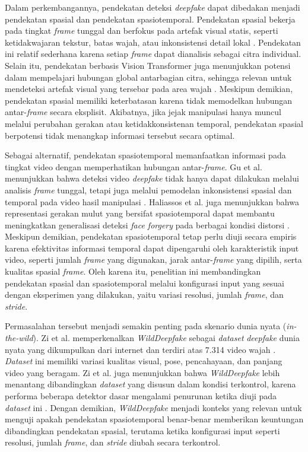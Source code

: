 Dalam perkembangannya, pendekatan deteksi \textit{deepfake} dapat dibedakan menjadi pendekatan spasial dan pendekatan spasiotemporal. Pendekatan spasial bekerja pada tingkat \textit{frame} tunggal dan berfokus pada artefak visual statis, seperti ketidakwajaran tekstur, batas wajah, atau inkonsistensi detail lokal \cite{Tolosana2020}\cite{Cao2022}. Pendekatan ini relatif sederhana karena setiap \textit{frame} dapat dianalisis sebagai citra individual. Selain itu, pendekatan berbasis Vision Transformer juga menunjukkan potensi dalam mempelajari hubungan global antarbagian citra, sehingga relevan untuk mendeteksi artefak visual yang tersebar pada area wajah \cite{dosovitskiy2021imageworth16x16words}\cite{app12062953}. Meskipun demikian, pendekatan spasial memiliki keterbatasan karena tidak memodelkan hubungan antar-\textit{frame} secara eksplisit. Akibatnya, jika jejak manipulasi hanya muncul melalui perubahan gerakan atau ketidakkonsistenan temporal, pendekatan spasial berpotensi tidak menangkap informasi tersebut secara optimal. \par

Sebagai alternatif, pendekatan spasiotemporal memanfaatkan informasi pada tingkat video dengan memperhatikan hubungan antar-\textit{frame}. Gu et al. menunjukkan bahwa deteksi video \textit{deepfake} tidak hanya dapat dilakukan melalui analisis \textit{frame} tunggal, tetapi juga melalui pemodelan inkonsistensi spasial dan temporal pada video hasil manipulasi \cite{Gu2021}. Haliassos et al. juga menunjukkan bahwa representasi gerakan mulut yang bersifat spasiotemporal dapat membantu meningkatkan generalisasi deteksi \textit{face forgery} pada berbagai kondisi distorsi \cite{Haliassos2021}. Meskipun demikian, pendekatan spasiotemporal tetap perlu diuji secara empiris karena efektivitas informasi temporal dapat dipengaruhi oleh karakteristik input video, seperti jumlah \textit{frame} yang digunakan, jarak antar-\textit{frame} yang dipilih, serta kualitas spasial \textit{frame}. Oleh karena itu, penelitian ini membandingkan pendekatan spasial dan spasiotemporal melalui konfigurasi input yang sesuai dengan eksperimen yang dilakukan, yaitu variasi resolusi, jumlah \textit{frame}, dan \textit{stride}. \par

Permasalahan tersebut menjadi semakin penting pada skenario dunia nyata (\textit{in-the-wild}). Zi et al. memperkenalkan \textit{WildDeepfake} sebagai \textit{dataset} \textit{deepfake} dunia nyata yang dikumpulkan dari internet dan terdiri atas 7.314 video wajah \cite{Zi2024}. \textit{Dataset} ini memiliki variasi kualitas visual, pose, pencahayaan, dan panjang video yang beragam. Zi et al. juga menunjukkan bahwa \textit{WildDeepfake} lebih menantang dibandingkan \textit{dataset} yang disusun dalam kondisi terkontrol, karena performa beberapa detektor dasar mengalami penurunan ketika diuji pada \textit{dataset} ini \cite{Zi2024}. Dengan demikian, \textit{WildDeepfake} menjadi konteks yang relevan untuk menguji apakah pendekatan spasiotemporal benar-benar memberikan keuntungan dibandingkan pendekatan spasial, terutama ketika konfigurasi input seperti resolusi, jumlah \textit{frame}, dan \textit{stride} diubah secara terkontrol. \par

